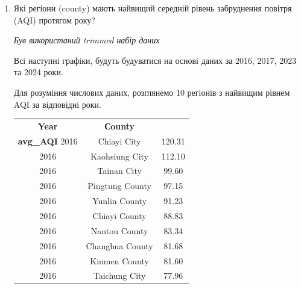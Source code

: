 \documentclass[./report.tex]{subfiles}
\begin{document}
\begin{enumerate}
    \item Які регіони (county) мають найвищий середній рівень забруднення повітря (AQI) протягом року?
    
    \quad \textit{Був використаний trimmed набір даних}

    Всі наступні графіки, будуть будуватися на основі даних за 2016, 2017, 2023 та 2024 роки.
    
    Для розуміння числових даних, розглянемо 10 регіонів з найвищим рівнем AQI за відповідні роки.
    
    \begin{tabular}{ccc}
        \textbf{Year} & \textbf{Сounty} \\ \textbf{avg\_AQI}
        2016 &       Chiayi City &   120.31 \\
        2016 &   Kaohsiung City &   112.10 \\
        2016 &       Tainan City &    99.60 \\
        2016 &   Pingtung County &    97.15 \\
        2016 &    Yunlin County &    91.23 \\
        2016 &    Chiayi County &    88.83 \\
        2016 &    Nantou County &    83.34 \\
        2016 &  Changhua County &    81.68 \\
        2016 &    Kinmen County &    81.60 \\
        2016 &   Taichung City &    77.96 \\
    \end{tabular}
    

\end{enumerate}
\end{document}
